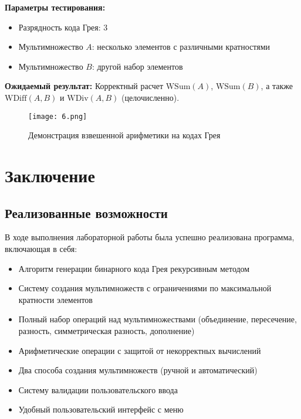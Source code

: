 \documentclass[12pt,a4paper]{article}
\begin{document}
\textbf{Параметры тестирования:}
\begin{itemize}
    \item Разрядность кода Грея: 3
    \item Мультимножество $A$: несколько элементов с различными кратностями
    \item Мультимножество $B$: другой набор элементов
\end{itemize}

\textbf{Ожидаемый результат:} Корректный расчет $\text{WSum}(A)$, $\text{WSum}(B)$, а также $\text{WDiff}(A,B)$ и $\text{WDiv}(A,B)$ (целочисленно).

\begin{figure}[h]
    \centering
    \texttt{[image: 6.png]}
    \caption{Демонстрация взвешенной арифметики на кодах Грея}
    \label{fig:weighted_gray}
\end{figure}

\newpage

\section{Заключение}

\subsection{Реализованные возможности}

В ходе выполнения лабораторной работы была успешно реализована программа, включающая в себя:

\begin{itemize}
    \item Алгоритм генерации бинарного кода Грея рекурсивным методом
    \item Систему создания мультимножеств с ограничениями по максимальной кратности элементов
    \item Полный набор операций над мультимножествами (объединение, пересечение, разность, симметрическая разность, дополнение)
    \item Арифметические операции с защитой от некорректных вычислений
    \item Два способа создания мультимножеств (ручной и автоматический)
    \item Систему валидации пользовательского ввода
    \item Удобный пользовательский интерфейс с меню
\end{itemize}
\end{document}
